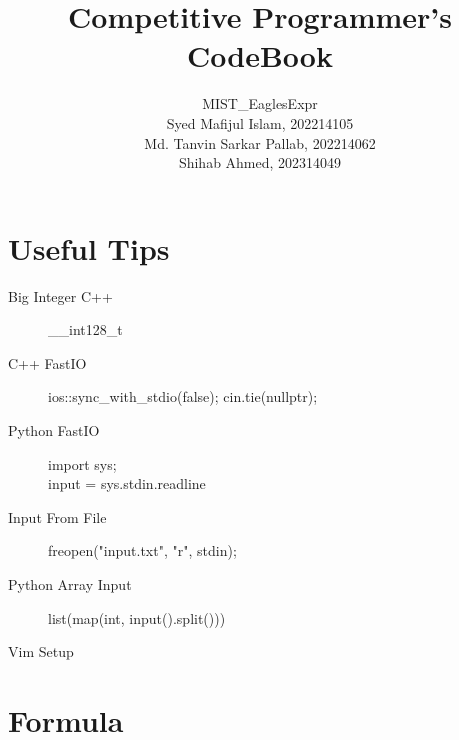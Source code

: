 \documentclass[10pt, a4paper]{article}
\title{Competitive Programmer’s CodeBook}
\author{MIST\_EaglesExpr\\[2cm] Syed Mafijul Islam, 202214105\\
Md. Tanvin Sarkar Pallab, 202214062\\
Shihab Ahmed, 202314049
}
\begin{document}
\maketitle
\thispagestyle{empty}

\newpage
\tableofcontents
\newpage

\begin{multicols}{2}

\section{Useful Tips}
\begin{description}
    \item[Big Integer C++] \_\_int128\_t
    \item[C++ FastIO] \hfill \break
    ios::sync\_with\_stdio(false);
    cin.tie(nullptr);
    \item[Python FastIO] \hfill \break
    import sys; \\
    input = sys.stdin.readline
    \item[Input From File] \hfill \break
    freopen("input.txt", "r", stdin);
    \item[Python Array Input] \hfill \break
    list(map(int, input().split()))
    \item [Vim Setup] \hfill
    
\end{description}

\section{Formula}

\end{multicols}
\end{document}
